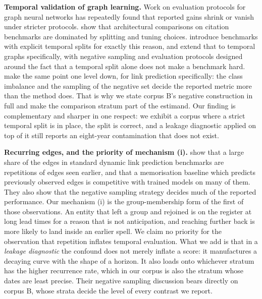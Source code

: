 \documentclass[twoside,11pt]{article}
\begin{document}
\textbf{Temporal validation of graph learning.} Work on evaluation protocols for graph neural networks has repeatedly found that reported gains shrink or vanish under stricter protocols. \citet{shchur} show that architectural comparisons on citation benchmarks are dominated by splitting and tuning choices. \citet{ogb} introduce benchmarks with explicit temporal splits for exactly this reason, and \citet{tgb} extend that to temporal graphs specifically, with negative sampling and evaluation protocols designed around the fact that a temporal split alone does not make a benchmark hard. \citet{yang_lp} make the same point one level down, for link prediction specifically: the class imbalance and the sampling of the negative set decide the reported metric more than the method does. That is why we state corpus B's negative construction in full and make the comparison stratum part of the estimand. Our finding is complementary and sharper in one respect: we exhibit a corpus where a strict temporal split is in place, the split is correct, and a leakage diagnostic applied on top of it still reports an eight-year contamination that does not exist.

\textbf{Recurring edges, and the priority of mechanism (i).} \citet{poursafaei} show that a large share of the edges in standard dynamic link prediction benchmarks are repetitions of edges seen earlier, and that a memorisation baseline which predicts previously observed edges is competitive with trained models on many of them. They also show that the negative sampling strategy decides much of the reported performance. Our mechanism (i) is the group-membership form of the first of those observations. An entity that left a group and rejoined is on the register at long lead times for a reason that is not anticipation, and reaching further back is more likely to land inside an earlier spell. We claim no priority for the observation that repetition inflates temporal evaluation. What we add is that in a \emph{leakage diagnostic} the confound does not merely inflate a score: it manufactures a decaying curve with the shape of a horizon. It also loads onto whichever stratum has the higher recurrence rate, which in our corpus is also the stratum whose dates are least precise. Their negative sampling discussion bears directly on corpus B, whose strata decide the level of every contrast we report.
\end{document}

